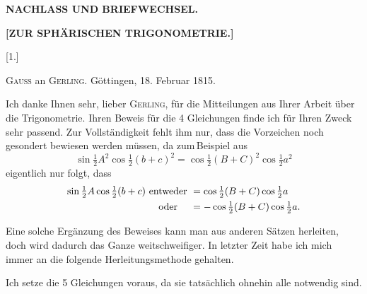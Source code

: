 \begin{center}
\textbf{NACHLASS UND BRIEFWECHSEL.}

\vspace{1em}

\textbf{[ZUR SPHÄRISCHEN TRIGONOMETRIE.]}

\vspace{0.5em}

\end{center}

\vspace{1em}

\begin{center}[1.]\end{center}

\begin{center}
\textsc{Gauss} an \textsc{Gerling}. Göttingen, 18. Februar 1815.
\end{center}

Ich danke Ihnen sehr, lieber \textsc{Gerling}, für die Mitteilungen aus
Ihrer Arbeit über die Trigonometrie. Ihren Beweis für die 4 Gleichungen finde
ich für Ihren Zweck sehr passend. Zur Vollständigkeit fehlt ihm nur,
dass die Vorzeichen noch gesondert bewiesen werden müssen,
da zum\,Beispiel aus
\[
\sin \tfrac12 A^2 \cos \tfrac12 (b+c)^2 = \cos \tfrac12 (B+C)^2 \cos \tfrac12 a^2
\]
eigentlich nur folgt, dass
\[
\begin{array}{r@{\ }c@{\ }l}
\sin \tfrac12 A \cos \tfrac12 (b+c) & \text{entweder} & {}=\cos \tfrac12 (B+C) \cos \tfrac12 a \\[4pt]
 & \text{oder} & {}=-\cos \tfrac12 (B+C) \cos \tfrac12 a.
\end{array}
\]

Eine solche Ergänzung des Beweises kann man aus anderen Sätzen herleiten,
doch wird dadurch das Ganze weitschweifiger. In letzter Zeit habe ich mich immer an
die folgende Herleitungsmethode gehalten.

Ich setze die 5 Gleichungen voraus, da sie tatsächlich ohnehin alle
notwendig sind.
